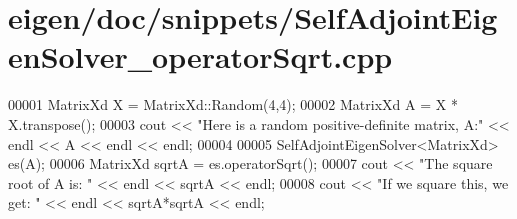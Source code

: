 \hypertarget{eigen_2doc_2snippets_2_self_adjoint_eigen_solver__operator_sqrt_8cpp_source}{}\section{eigen/doc/snippets/\+Self\+Adjoint\+Eigen\+Solver\+\_\+operator\+Sqrt.cpp}
\label{eigen_2doc_2snippets_2_self_adjoint_eigen_solver__operator_sqrt_8cpp_source}

\begin{DoxyCode}
00001 MatrixXd X = MatrixXd::Random(4,4);
00002 MatrixXd A = X * X.transpose();
00003 cout << \textcolor{stringliteral}{"Here is a random positive-definite matrix, A:"} << endl << A << endl << endl;
00004 
00005 SelfAdjointEigenSolver<MatrixXd> es(A);
00006 MatrixXd sqrtA = es.operatorSqrt();
00007 cout << \textcolor{stringliteral}{"The square root of A is: "} << endl << sqrtA << endl;
00008 cout << \textcolor{stringliteral}{"If we square this, we get: "} << endl << sqrtA*sqrtA << endl;
\end{DoxyCode}
